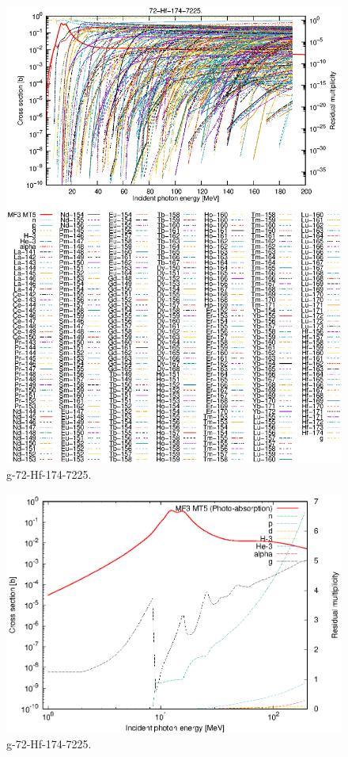 \begin{figure}
 \includegraphics[width=\linewidth]{eps/g_72-Hf-174_7225.eps}
  \caption{g-72-Hf-174-7225.}
\end{figure}
\newpage \clearpage

\begin{figure}
 \includegraphics[width=\linewidth]{eps-log/g_72-Hf-174_7225.eps}
 \caption{g-72-Hf-174-7225.}
\end{figure}
\newpage \clearpage

